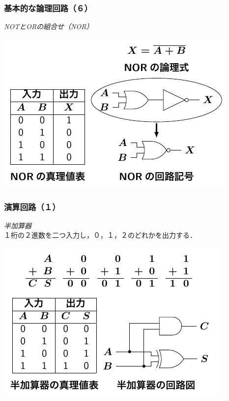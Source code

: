 \documentclass[handout]{beamer}        %
\begin{document}
\begin{frame}
  \frametitle{基本的な論理回路（６）}
  \emph{NOTとORの組合せ（NOR）} \\
  \vfill
  \centerline{\includegraphics[scale=1.3]{../Tikz/nor.pdf}}
  \vfill
\end{frame}

\begin{frame}
  \frametitle{演算回路（１）}
  \emph{半加算器} \\
  １桁の２進数を二つ入力し，０，１，２のどれかを出力する．
  \vfill
  \centerline{\includegraphics[scale=1.3]{../Tikz/ha.pdf}}
  \vfill
\end{frame}
\end{document}
